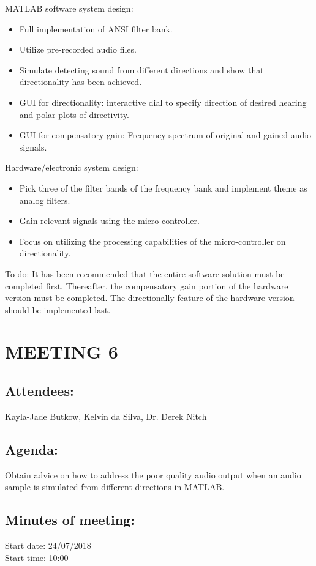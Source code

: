 \documentclass[10pt,onecolumn]{witseiepaper}
\begin{document}
MATLAB software system design:
\begin{itemize}
	\item Full implementation of ANSI filter bank.
	\item Utilize pre-recorded audio files.
	\item Simulate detecting sound from different directions and show that directionality has been achieved.
	\item GUI for directionality: interactive dial to specify direction of desired hearing and polar plots of directivity.
	\item GUI for compensatory gain: Frequency spectrum of original and gained audio signals.
\end{itemize}

Hardware/electronic system design:
\begin{itemize}
	\item Pick three of the filter bands of the frequency bank and implement theme as analog filters.
	\item Gain relevant signals using the micro-controller.
	\item Focus on utilizing the processing capabilities of the micro-controller on directionality.
\end{itemize}

To do:
It has been recommended that the entire software solution must be completed first. Thereafter, the compensatory gain portion of the hardware version must be completed. The directionally feature of the hardware version should be implemented last.


\section*{MEETING 6}
\subsection*{Attendees:}
Kayla-Jade Butkow, Kelvin da Silva, Dr. Derek Nitch
\subsection*{Agenda:} 
Obtain advice on how to address the poor quality audio output when an audio sample is simulated from different directions in MATLAB.

\subsection*{Minutes of meeting:}
Start date: 24/07/2018 \\
Start time: 10:00
\end{document}
